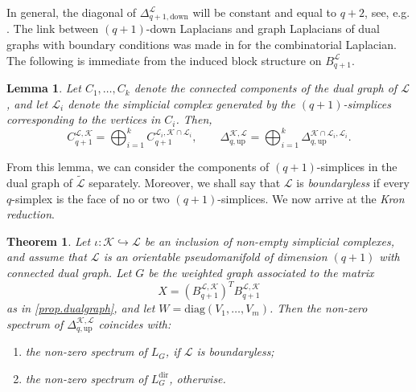 \documentclass{article}
\newtheorem{theorem}{Theorem}[section]
\newtheorem{lemma}{Lemma}[section]
\newcommand{\KK}{\mathcal{K}}
\newcommand{\LL}{\mathcal{L}}
\begin{document}
In general, the diagonal of $\Delta_{q+1, \mathrm{down}}^\LL$ will be constant and equal to $q+2$, see, e.g. \cite{MR3077874}. The link between $(q+1)$-down Laplacians and graph Laplacians of dual graphs with boundary conditions was made in \cite[Fig. 5]{MR3194207} for the combinatorial Laplacian. 
The following is immediate from the induced block structure on $B_{q+1}^\LL$. 
\begin{lemma}
    Let $C_1, \ldots, C_k$ denote the connected components of the dual graph of $\LL$, and let $\LL_i$ denote the simplicial complex generated by the $(q+1)$-simplices corresponding to the vertices in $C_i$. Then, \[
C_{q+1}^{\LL,\KK}=\bigoplus_{i=1}^k C_{q+1}^{\LL_i,\KK\cap\LL_i},
\qquad
\Delta_{q,\mathrm{up}}^{\KK,\LL}
=
\bigoplus_{i=1}^k
\Delta_{q,\mathrm{up}}^{\KK\cap\LL_i,\LL_i}.
\]
\end{lemma}

From this lemma, we can consider the components of $(q+1)$-simplices in the dual graph of $\widetilde{\LL}$ separately. Moreover, we shall say that $\LL$ is \emph{boundaryless} if every $q$-simplex is the face of no or two $(q+1)$-simplices.  We now arrive at the \emph{Kron reduction}.

\begin{theorem}
\label{thm.spectum.graph}
Let $\iota\colon \KK \hookrightarrow \LL$ be an inclusion of non-empty simplicial complexes, and assume that $\LL$ is an orientable pseudomanifold of dimension $(q+1)$ with connected dual graph. Let \(G\) be the weighted graph associated to the matrix
\[
X=(B^{\LL,\KK}_{q+1})^T B^{\LL,\KK}_{q+1}
\]
as in \cref{prop.dualgraph}, and let \(W=\mathrm{diag}(V_1,\ldots,V_m)\). Then the non-zero spectrum of $\Delta^{\KK,\LL}_{q,\mathrm{up}}$ coincides with:
\begin{enumerate}
    \item[(i)] the non-zero spectrum of $L_G$, if ${\LL}$ is boundaryless;
    \item[(ii)] the non-zero spectrum of $L_G^{\mathrm{dir}}$, otherwise.
\end{enumerate}
\end{theorem}
\end{document}
